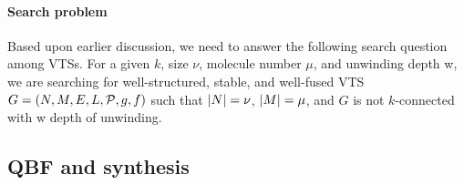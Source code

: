 \paragraph{Search problem}
Based upon earlier discussion, we need to answer the following search
question among VTSs.
For a given $k$, size $\nu$, molecule number $\mu$, and unwinding depth w,
we are searching for well-structured, stable, and well-fused VTS
$G = (N,M,E,L,\mathcal{P},g,f)$ such that
$|N| = \nu$, $|M| = \mu$, and $G$ is not $k$-connected with w depth of unwinding.    

\subsection{QBF and synthesis}



             
